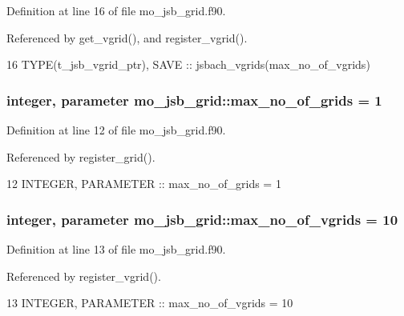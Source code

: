 Definition at line 16 of file mo\+\_\+jsb\+\_\+grid.\+f90.



Referenced by get\+\_\+vgrid(), and register\+\_\+vgrid().


\begin{DoxyCode}
16   \textcolor{keywordtype}{TYPE}(t\_jsb\_vgrid\_ptr), \textcolor{keywordtype}{SAVE} :: jsbach\_vgrids(max\_no\_of\_vgrids)
\end{DoxyCode}
\hypertarget{namespacemo__jsb__grid_a1d86a8db41131c146df75f25afca96ed}{}
\subsubsection[{max\+\_\+no\+\_\+of\+\_\+grids}]{\setlength{\rightskip}{0pt plus 5cm}integer, parameter mo\+\_\+jsb\+\_\+grid\+::max\+\_\+no\+\_\+of\+\_\+grids = 1}\label{namespacemo__jsb__grid_a1d86a8db41131c146df75f25afca96ed}


Definition at line 12 of file mo\+\_\+jsb\+\_\+grid.\+f90.



Referenced by register\+\_\+grid().


\begin{DoxyCode}
12   \textcolor{keywordtype}{INTEGER}, \textcolor{keywordtype}{PARAMETER} :: max\_no\_of\_grids = 1
\end{DoxyCode}
\hypertarget{namespacemo__jsb__grid_a9155254cdfdc8f5d4faab808185807d6}{}
\subsubsection[{max\+\_\+no\+\_\+of\+\_\+vgrids}]{\setlength{\rightskip}{0pt plus 5cm}integer, parameter mo\+\_\+jsb\+\_\+grid\+::max\+\_\+no\+\_\+of\+\_\+vgrids = 10}\label{namespacemo__jsb__grid_a9155254cdfdc8f5d4faab808185807d6}


Definition at line 13 of file mo\+\_\+jsb\+\_\+grid.\+f90.



Referenced by register\+\_\+vgrid().


\begin{DoxyCode}
13   \textcolor{keywordtype}{INTEGER}, \textcolor{keywordtype}{PARAMETER} :: max\_no\_of\_vgrids = 10
\end{DoxyCode}
